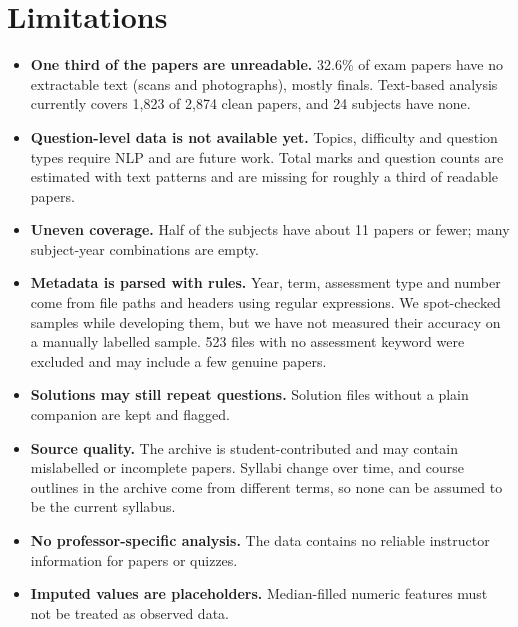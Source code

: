 \documentclass[11pt,a4paper]{article}
\begin{document}
\section{Limitations}
\label{sec:limits}
\begin{itemize}
  \item \textbf{One third of the papers are unreadable.} 32.6\% of exam papers have no extractable text (scans and photographs), mostly finals. Text-based analysis currently covers 1{,}823 of 2{,}874 clean papers, and 24 subjects have none.
  \item \textbf{Question-level data is not available yet.} Topics, difficulty and question types require NLP and are future work. Total marks and question counts are estimated with text patterns and are missing for roughly a third of readable papers.
  \item \textbf{Uneven coverage.} Half of the subjects have about 11 papers or fewer; many subject-year combinations are empty.
  \item \textbf{Metadata is parsed with rules.} Year, term, assessment type and number come from file paths and headers using regular expressions. We spot-checked samples while developing them, but we have not measured their accuracy on a manually labelled sample. 523 files with no assessment keyword were excluded and may include a few genuine papers.
  \item \textbf{Solutions may still repeat questions.} Solution files without a plain companion are kept and flagged.
  \item \textbf{Source quality.} The archive is student-contributed and may contain mislabelled or incomplete papers. Syllabi change over time, and course outlines in the archive come from different terms, so none can be assumed to be the current syllabus.
  \item \textbf{No professor-specific analysis.} The data contains no reliable instructor information for papers or quizzes.
  \item \textbf{Imputed values are placeholders.} Median-filled numeric features must not be treated as observed data.
\end{itemize}
\end{document}
